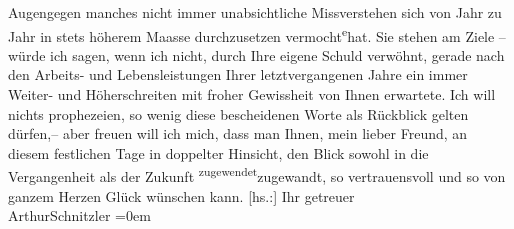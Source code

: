 \begin{ledgroupsized}[t]{13cm}
               Augen\label{T_L02950-1v}\label{T_L02950-1h}{\pb}gegen
               manches nicht immer unabsichtliche Missverstehen sich von Jahr zu Jahr in stets
               höherem Maasse durchzusetzen vermocht\substVorne{}\textsuperscript{e}\substDazwischen{}{ }hat\substHinten{}. Sie stehen am Ziele – würde ich sagen, wenn ich nicht, durch Ihre eigene
               Schuld verwöhnt, gerade nach den Arbeits- und Lebensleistungen Ihrer letztvergangenen
               Jahre ein immer Weiter- und Höherschreiten mit froher Gewissheit von Ihnen erwartete.
               Ich will nichts prophezeien, so wenig diese bescheidenen Worte als Rückblick gelten
               dürfen,– aber freuen  will ich mich, dass man
               Ihnen, mein lieber Freund, an diesem festlichen Tage in doppelter Hinsicht, den Blick
               sowohl in die Vergangenheit als der Zukunft \substVorne{}\textsuperscript{zugewendet}{\allowbreak}\substDazwischen{}zugewandt\substHinten{}, so vertrauensvoll und so von ganzem Herzen Glück wünschen kann.\pend
           \pstart
           {[}hs.:{]} Ihr getreuer{\\[\baselineskip]}\spacefill\mbox{ArthurSchnitzler}\pend
           \leftskip=0em{}
         
         \endnumbering{}\end{ledgroupsized}  \newcommand{\dateiname}{L02950}\newcommand{\titel}{Arthur Schnitzler an Felix Salten, 29. 7. 1929}\newcommand{\editorInnen}{Martin Anton Müller und Laura Untner}
      
